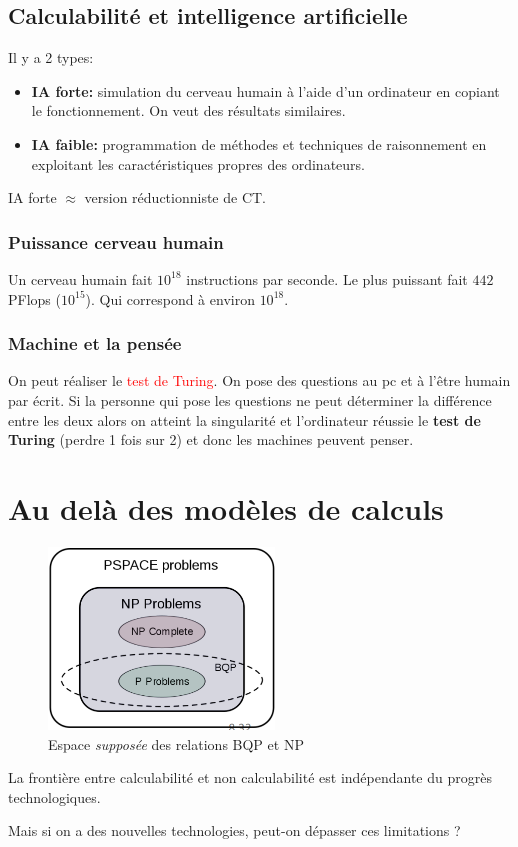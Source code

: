 \documentclass{report}
\begin{document}
\subsection{Calculabilité et intelligence artificielle}
Il y a 2 types:
\begin{itemize}
	\item \textbf{IA forte:} simulation du cerveau humain à l'aide d'un ordinateur en copiant le fonctionnement. On veut des résultats similaires.
	\item \textbf{IA faible:} programmation de méthodes et techniques de raisonnement en exploitant les caractéristiques propres des ordinateurs.
\end{itemize}
IA forte $\approx$ version réductionniste de CT.

\subsubsection{Puissance cerveau humain}
Un cerveau humain fait $10^{18}$ instructions par seconde. Le plus puissant fait $442$ PFlops ($10^{15}$). Qui correspond à environ $10^{18}$.

\subsubsection{Machine et la pensée}
On peut réaliser le \textcolor{red}{test de Turing}. On pose des questions au pc et à l'être humain par écrit. Si la personne qui pose les questions ne peut déterminer la différence entre les deux alors on atteint la singularité et l'ordinateur réussie le \textbf{test de Turing} (perdre 1 fois sur 2) et donc les machines peuvent penser.

\section{Au delà des modèles de calculs}
\begin{figure}
\centering
\includegraphics[width=6cm]{img/quantum.png}
\caption{Espace \textit{supposée} des relations BQP et NP}
\end{figure}
La frontière entre calculabilité et non calculabilité est indépendante du progrès technologiques.\par 
Mais si on a des nouvelles technologies, peut-on dépasser ces limitations ?
\end{document}
